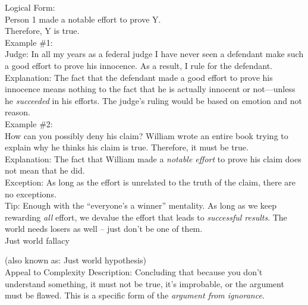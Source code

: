 \documentclass[a4paper,12pt,single,pdftex]{scrartcl}
\begin{document}
    
      Logical Form:
    \\

    
      Person 1 made a notable effort to prove Y.
    \\

    
      Therefore, Y is true.
    \\

    
      Example \#1:
    \\

    
      Judge: In all my years as a federal judge I have never seen a defendant make such a good effort to prove his innocence.  As a result, I rule for the defendant.
    \\

    
      Explanation: The fact that the defendant made a good effort to prove his innocence means nothing to the fact that he is actually innocent or not—unless he {\it succeeded }in his efforts.  The judge's ruling would be based on emotion and not reason.
    \\

    
      Example \#2:
    \\

    
      How can you possibly deny his claim?  William wrote an entire book trying to explain why he thinks his claim is true.  Therefore, it must be true.
    \\

    
      Explanation: The fact that William made a {\it notable effort}  to prove his claim does not mean that he did.
    \\

    
      Exception: As long as the effort is unrelated to the truth of the claim, there are no exceptions.
    \\

    
      Tip: Enough with the “everyone’s a winner” mentality.  As long as we keep rewarding {\it all} effort, we devalue the effort that leads to {\it successful results}.  The world needs losers as well -- just don’t be one of them.
    \\

  

Just world fallacy
    
      (also known as: Just world hypothesis)
    \\

  

Appeal to Complexity
    Description: Concluding that because you don't understand something, it must not be true, it's improbable, or the argument must be flawed. This is a specific form of the {\it argument from ignorance}.
\end{document}
